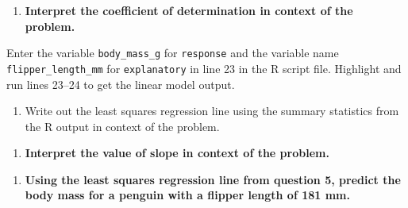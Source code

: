 \documentclass[
]{report}
\newenvironment{Shaded}{\begin{snugshade}}{\end{snugshade}}
\newcommand{\AttributeTok}[1]{\textcolor[rgb]{0.77,0.63,0.00}{#1}}
\newcommand{\CommentTok}[1]{\textcolor[rgb]{0.56,0.35,0.01}{\textit{#1}}}
\newcommand{\FunctionTok}[1]{\textcolor[rgb]{0.00,0.00,0.00}{#1}}
\newcommand{\NormalTok}[1]{#1}
\newcommand{\OtherTok}[1]{\textcolor[rgb]{0.56,0.35,0.01}{#1}}
\newcommand{\SpecialCharTok}[1]{\textcolor[rgb]{0.00,0.00,0.00}{#1}}
\providecommand{\tightlist}{%
  \setlength{\itemsep}{0pt}\setlength{\parskip}{0pt}}
\begin{document}
\vspace{0.5in}

\begin{enumerate}
\def\labelenumi{\arabic{enumi}.}
\setcounter{enumi}{3}
\tightlist
\item
  \textbf{Interpret the coefficient of determination in context of the problem.}
\end{enumerate}

\vspace{1in}

Enter the variable \texttt{body\_mass\_g} for \texttt{response} and the variable name \texttt{flipper\_length\_mm} for \texttt{explanatory} in line 23 in the R script file. Highlight and run lines 23--24 to get the linear model output.

\begin{Shaded}
\end{Shaded}

\begin{enumerate}
\def\labelenumi{\arabic{enumi}.}
\setcounter{enumi}{4}
\tightlist
\item
  Write out the least squares regression line using the summary statistics from the R output in context of the problem.
\end{enumerate}

\vspace{.5in}

\begin{enumerate}
\def\labelenumi{\arabic{enumi}.}
\setcounter{enumi}{5}
\tightlist
\item
  \textbf{Interpret the value of slope in context of the problem.}
\end{enumerate}

\vspace{.8in}

\begin{enumerate}
\def\labelenumi{\arabic{enumi}.}
\setcounter{enumi}{6}
\tightlist
\item
  \textbf{Using the least squares regression line from question 5, predict the body mass for a penguin with a flipper length of 181 mm.}
\end{enumerate}
\end{document}
